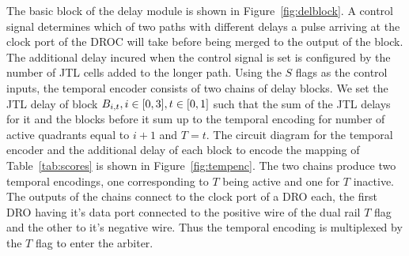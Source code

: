 The basic block of the delay module is shown in Figure~\ref{fig:delblock}.
A control signal determines which of two paths with different delays a pulse arriving at the clock port of the DROC will take before being merged to the output of the block.
The additional delay incured when the control signal is set is configured by the number of JTL cells added to the longer path.
Using the $S$ flags as the control inputs, the temporal encoder consists of two chains of delay blocks.
We set the JTL delay of block $B_{i,t}, i \in \interval{0}{3}, t \in \interval{0}{1}$ such that the sum of the JTL delays for it and the blocks before it sum up to the temporal encoding for number of active quadrants equal to $i+1$ and $T = t$.
The circuit diagram for the temporal encoder and the additional delay of each block to encode the mapping of Table~\ref{tab:scores} is shown in Figure~\ref{fig:tempenc}.
The two chains produce two temporal encodings, one corresponding to $T$ being active and one for $T$ inactive.
The outputs of the chains connect to the clock port of a DRO each, the first DRO having it's data port connected to the positive wire of the dual rail $T$ flag and the other to it's negative wire.
Thus the temporal encoding is multiplexed by the $T$ flag to enter the arbiter.

